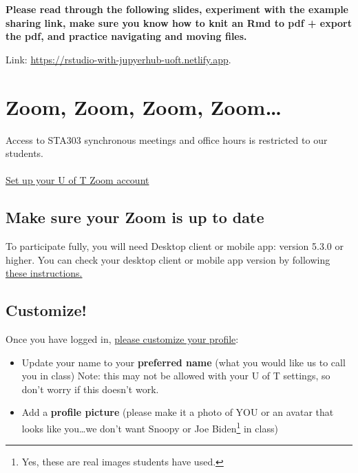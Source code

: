 \documentclass[
]{book}
\begin{document}
\textbf{Please read through the following slides, experiment with the example sharing link, make sure you know how to knit an Rmd to pdf + export the pdf, and practice navigating and moving files.}

Link: \url{https://rstudio-with-jupyerhub-uoft.netlify.app}.

\hypertarget{zoom-zoom-zoom-zoom}{%
\section{Zoom, Zoom, Zoom, Zoom\ldots{}}\label{zoom-zoom-zoom-zoom}}

\hfill\break
Access to STA303 synchronous meetings and office hours is restricted to our students.\\
~\\

\href{https://utoronto.zoom.us/signin}{Set up your U of T Zoom account}

\hypertarget{make-sure-your-zoom-is-up-to-date}{%
\subsection{Make sure your Zoom is up to date}\label{make-sure-your-zoom-is-up-to-date}}

To participate fully, you will need Desktop client or mobile app: version 5.3.0 or higher. You can check your desktop client or mobile app version by following \href{https://support.zoom.us/hc/en-us/articles/201362393-Viewing-the-Zoom-version-number}{these instructions.}

\hypertarget{customize}{%
\subsection{Customize!}\label{customize}}

Once you have logged in, \href{https://support.zoom.us/hc/en-us/articles/201363203-Customizing-your-Profile}{please customize your profile}:

\begin{itemize}
\item
  Update your name to your \textbf{preferred name} (what you would like us to call you in class) Note: this may not be allowed with your U of T settings, so don't worry if this doesn't work.
\item
  Add a \textbf{profile picture} (please make it a photo of YOU or an avatar that looks like you\ldots we don't want Snoopy or Joe Biden\footnote{Yes, these are real images students have used.} in class)
\end{itemize}
\end{document}
